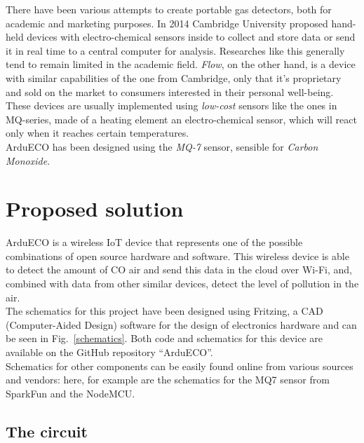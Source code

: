 \documentclass[conference]{IEEEtran}
\begin{document}
	There have been various attempts to create portable gas detectors, both for academic and marketing purposes.
	In 2014 Cambridge University proposed hand-held devices with electro-chemical sensors inside to collect and store data or send it in real time to a central computer for analysis\cite{cambridge}.
	Researches like this generally tend to remain limited in the academic field.
	\textit{Flow}\cite{flow}, on the other hand, is a device with similar capabilities of the one from Cambridge, only that it's proprietary and sold on the market to consumers interested in their personal well-being.\\
	These devices are usually implemented using \textit{low-cost} sensors like the ones in MQ-series, made of a heating element an electro-chemical sensor, which will react only when it reaches certain temperatures.\\
	ArduECO has been designed using the \textit{MQ-7} sensor, sensible for \textit{Carbon Monoxide}.
	
\section{Proposed solution}\label{solution}
	
	ArduECO is a wireless IoT device that represents one of the possible combinations of open source hardware and software.
	This wireless device is able to detect the amount of CO air and send this data in the cloud over Wi-Fi, and, combined with data from other similar devices, detect the level of pollution in the air.\\
	The schematics for this project have been designed using Fritzing, a CAD (Computer-Aided Design) software for the design of electronics hardware\cite{fritzing} and can be seen in Fig.~\ref{schematics}.
	Both code and schematics for this device are available on the GitHub repository ``ArduECO''\cite{ardueco_git}.\\
	Schematics for other components can be easily found online from various sources and vendors: here, for example are the schematics for the MQ7 sensor from SparkFun\cite{spark_mq} and the NodeMCU\cite{node_scheme}.
	
	\subsection{The circuit}\label{circuit}
	
\end{document}
